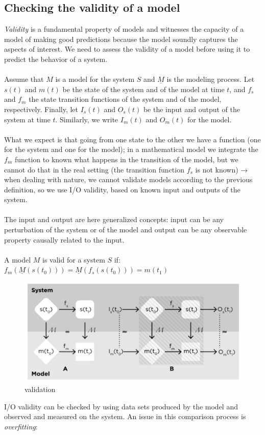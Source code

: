 \subsection{Checking the validity of a model}

\emph{Validity} is a fundamental property of models and witnesses the
capacity of a model of making good predictions because the model soundly
captures the aspects of interest. We need to assess the validity of a
model before using it to predict the behavior of a system.
\\
\\
\noindent
Assume that $M$ is a model for the system $S$ and $\underline{M}$ is the
modeling process. Let $s(t)$ and $m(t)$ be the state of the system and
of the model at time $t$, and $f_s$ and $f_m$ the state transition
functions of the system and of the model, respectively. Finally, let
$I_s(t)$ and $O_s(t)$ be the input and output of the system at time $t$.
Similarly, we write $I_m(t)$ and $O_m(t)$ for the model.
\\
\\
\noindent
What we expect is that going from one state to the other we have a
function (one for the system and one for the model); in a mathematical
model we integrate the $f_m$ function to known what happens in the
transition of the model, but we cannot do that in the real setting (the
transition function $f_s$ is not known) → when dealing with nature, we
cannot validate models according to the previous definition, so we use
I/O validity, based on known input and outputs of the system.
\\
\\
\noindent
The input and output are here generalized concepts: input can be any
perturbation of the system or of the model and output can be any
observable property causally related to the input.
\\
\\
\noindent
A model $M$ is valid for a system $S$ if:
$f_m(\underline{M}(s(t_0))) = \underline{M}(f_s(s(t_0))) = m(t_1)$

\begin{figure}
\centering
\includegraphics[width=\textwidth]{validation.png}
\caption{validation}
\end{figure}
\noindent
I/O validity can be checked by using data sets produced by the model and
observed and measured on the system. An issue in this comparison process
is \emph{overfitting}:

